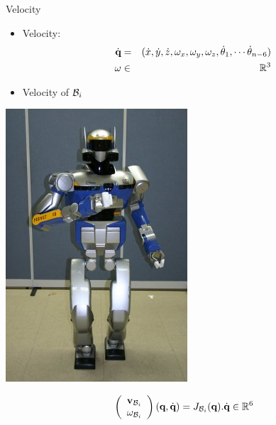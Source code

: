 %
%

\begin{frame} {Velocity}
  \parbox{.71\linewidth} {
  \begin{itemize}
    \item Velocity: 
    \begin{eqnarray*}
      \dot{\textbf{q}} &=& (\dot{x}, \dot{y}, \dot{z}, \omega_{x}, \omega_{y}, \omega_{z},\dot{\theta}_1,\cdots \dot{\theta}_{n-6})\\
      \omega &\in& \mathbb{R}^3
    \end{eqnarray*}
  \pause
  \item Velocity of ${\cal B}_i$
  \end{itemize}
  }
  \parbox {.28\linewidth} {
    \centerline {
      \includegraphics[width=\linewidth]{figures/hrp2}
    }
  }
  \pause
   $$
    \left(\begin{array}{l} \textbf{v}_{{\cal B}_i} \\ \omega_{{\cal B}_i}\end{array}\right) (\textbf{q}, \dot{\textbf{q}}) = J_{{\cal B}_i} (\textbf{q}).\dot{\textbf{q}} \in \mathbb{R}^6
    $$
\end{frame}

